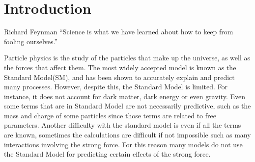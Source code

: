 \chapter{Introduction}
\label{intro_chapter}

\begin{chapquote}{Richard Feynman}
``Science is what we have learned about how to keep from fooling ourselves.''
\end{chapquote}
Particle physics is the study of the particles that make up the universe, as well as the forces that affect them. The most widely accepted model is known as the Standard Model(SM), and has been shown to accurately explain and predict many processes. However, despite this, the Standard Model is limited. For instance, it does not account for dark matter, dark energy or even gravity. Even some terms that are in Standard Model are not necessarily predictive, such as the mass and charge of some particles since those terms are related to free parameters. Another difficulty with the standard model is even if all the terms are known, sometimes the calculations are difficult if not impossible such as many interactions involving the strong force. For this reason many models do not use the Standard Model for predicting certain effects of the strong force. 


